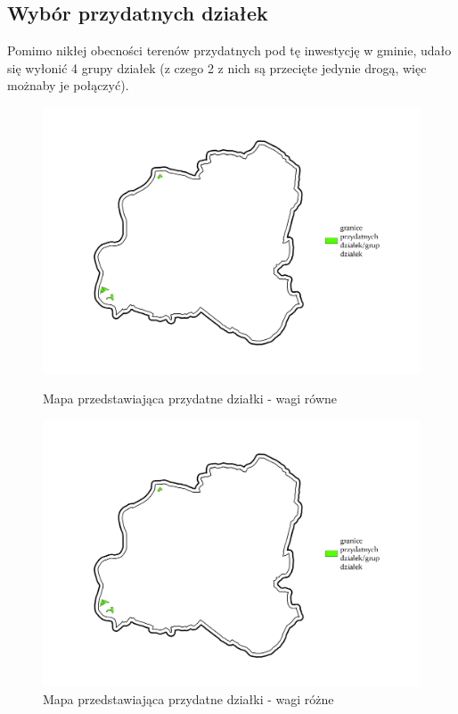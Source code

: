 \documentclass{article}
\begin{document}
\subsection{Wybór przydatnych działek}

Pomimo nikłej obecności terenów przydatnych pod tę inwestycję w gminie, udało się wyłonić 4 grupy działek (z czego 2 z nich są przecięte jedynie drogą, więc możnaby je połączyć).

\begin{figure}[H]
    \begin{minipage}[t]{0.48\textwidth}
        \centering
        \includegraphics[width=\linewidth]{img/plesna-przydatne-dzialki.jpg}
        \caption{Mapa przedstawiająca przydatne działki - wagi równe}
        \label{fig:przydatne-dzialki-rowne}
    \end{minipage}
    \hfill
    \begin{minipage}[t]{0.48\textwidth}
        \centering
        \includegraphics[width=\linewidth]{img/plesna-przydatne-dzialki.jpg}
        \caption{Mapa przedstawiająca przydatne działki - wagi różne}
        \label{fig:przydatne-dzialki-rozne}
    \end{minipage}
\end{figure}
\end{document}
